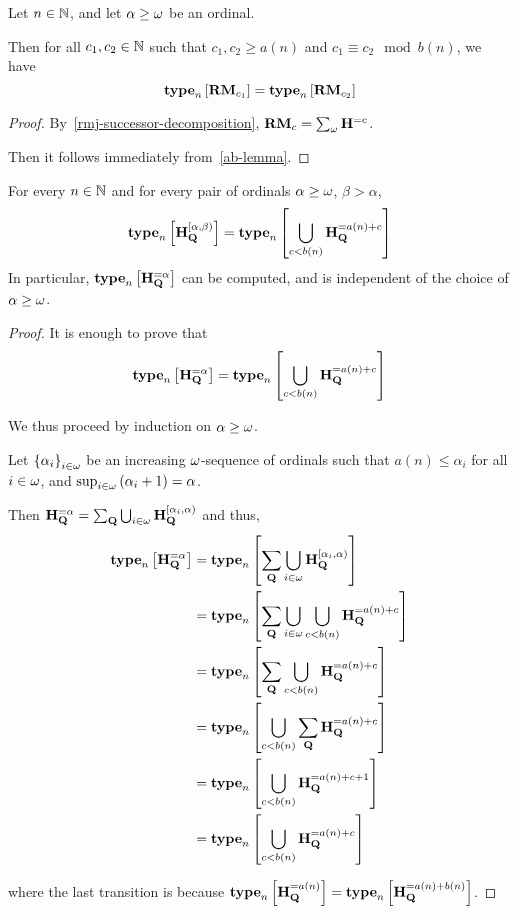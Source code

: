 \begin{corollary}\label{rmj-computable}
    Let $n \in \mathbb{N}$, and let $\alpha \ge \omega$ be an ordinal.

    Then for all $c_1, c_2 \in \mathbb{N}$ such that $c_1, c_2 \ge a(n)$ and $c_1 \equiv c_2 \mod b(n)$,
    we have
    \[\mathbf{type}_{n} \left[ {\mathbf{RM}_{c_1}} \right] = \mathbf{type}_{n} \left[ {\mathbf{RM}_{c_2}} \right]\]
\end{corollary}

\begin{proof}
    By~\cref{rmj-successor-decomposition}, $\mathbf{RM}_{c} = \sum_{\omega}{\mathbf{H}_{}^{= c}}$.

    Then it follows immediately from~\cref{ab-lemma}.
\end{proof}

\begin{lemma}
    For every $n \in \mathbb{N}$ and for every pair of ordinals $\alpha \ge \omega$,
    $\beta > \alpha$,
    \[
        \mathbf{type}_{n} \left[ {\mathbf{H}_{\mathbf{Q}}^{[\alpha, \beta)}} \right] = \mathbf{type}_{n} \left[ {\bigcup_{c < b(n)}{\mathbf{H}_{\mathbf{Q}}^{= a(n) + c}}} \right]
    \]
    In particular, $\mathbf{type}_{n} \left[ {\mathbf{H}_{\mathbf{Q}}^{= \alpha}} \right]$ can be computed,
    and is independent of the choice of $\alpha \ge \omega$.
\end{lemma}

\begin{proof}
    It is enough to prove that
    \[
        \mathbf{type}_{n} \left[ {\mathbf{H}_{\mathbf{Q}}^{= \alpha}} \right] = \mathbf{type}_{n} \left[ {\bigcup_{c < b(n)}{\mathbf{H}_{\mathbf{Q}}^{= a(n) + c}}} \right]
    \]

    We thus proceed by induction on $\alpha \ge \omega$.

    Let $\left\{ {\alpha_i} \right\}_{i \in \omega}$ be an increasing $\omega$-sequence of ordinals
    such that $a(n) \le \alpha_i$ for all $i \in \omega$,
    and $\sup_{i \in \omega} \left( {\alpha_i + 1} \right) = \alpha$.

    Then $\mathbf{H}_{\mathbf{Q}}^{= \alpha} = \sum_{\mathbf{Q}}{\bigcup_{i \in \omega} \mathbf{H}_{\mathbf{Q}}^{[\alpha_i, \alpha)}}$ and thus,
    \begin{align*}
        \mathbf{type}_{n} \left[ {\mathbf{H}_{\mathbf{Q}}^{= \alpha}} \right]
         & = \mathbf{type}_{n} \left[ {\sum_{\mathbf{Q}} \bigcup_{i \in \omega} \mathbf{H}_{\mathbf{Q}}^{[\alpha_i, \alpha)}} \right]             \\
         & = \mathbf{type}_{n} \left[ {\sum_{\mathbf{Q}} \bigcup_{i \in \omega} \bigcup_{c < b(n)}{\mathbf{H}_{\mathbf{Q}}^{= a(n) + c}}} \right] \\
         & = \mathbf{type}_{n} \left[ {\sum_{\mathbf{Q}} \bigcup_{c < b(n)}{\mathbf{H}_{\mathbf{Q}}^{= a(n) + c}}} \right]                     \\
         & = \mathbf{type}_{n} \left[ {\bigcup_{c < b(n)}{\sum_{\mathbf{Q}} \mathbf{H}_{\mathbf{Q}}^{= a(n) + c}}} \right]                     \\
         & = \mathbf{type}_{n} \left[ {\bigcup_{c < b(n)}{\mathbf{H}_{\mathbf{Q}}^{= a(n) + c + 1}}} \right]                            \\
         & = \mathbf{type}_{n} \left[ {\bigcup_{c < b(n)}{\mathbf{H}_{\mathbf{Q}}^{= a(n) + c}}} \right]
    \end{align*}

    where the last transition is because $\mathbf{type}_{n} \left[ {\mathbf{H}_{\mathbf{Q}}^{= a(n)}} \right] = \mathbf{type}_{n} \left[ {\mathbf{H}_{\mathbf{Q}}^{= a(n) + b(n)}} \right]$.
\end{proof}

